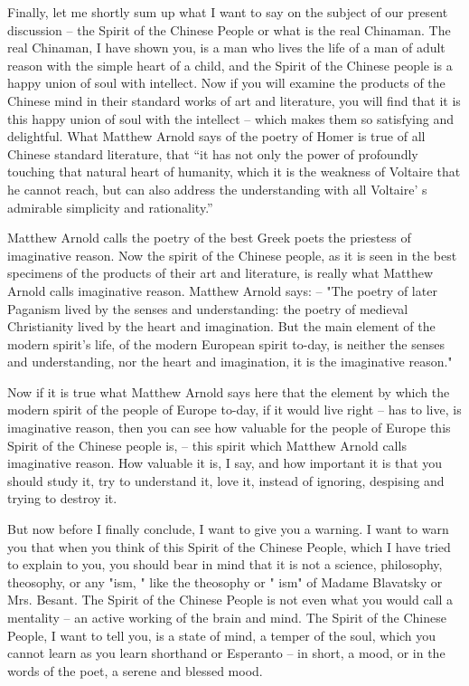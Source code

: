 Finally, let me shortly sum up what I want to say on the subject of our present discussion
-- the Spirit of the Chinese People or what is the real Chinaman.
The real Chinaman, I have shown you, is a man who lives the life of a man of adult reason with the simple heart of a child,
and the Spirit of the Chinese people is a happy union of soul with intellect.
Now if you will examine the products of the Chinese mind in their standard works of art and literature,
you will find that it is this happy union of soul with the intellect
-- which makes them so satisfying and delightful.
What Matthew Arnold says of the poetry of Homer is true of all Chinese standard literature, that
``it has not only the power of profoundly touching that natural heart of humanity,
which it is the weakness of Voltaire that he cannot reach,
but can also address the understanding with all Voltaire' s admirable simplicity and rationality.''

Matthew Arnold calls the poetry of the best Greek poets the priestess of imaginative reason. Now the spirit of the Chinese people, as it is seen in the best specimens of the products of their art and literature, is really what Matthew Arnold calls imaginative reason. Matthew Arnold says: -- "The poetry of later Paganism lived by the senses and understanding: the poetry of medieval Christianity lived by the heart and imagination. But the main element of the modern spirit's life, of the modern European spirit to-day, is neither the senses and understanding, nor the heart and imagination, it is the imaginative reason."

Now if it is true what Matthew Arnold says here that the element by which the modern spirit of the people of Europe to-day, if it would live right
-- has to live, is imaginative reason, then you can see how valuable for the people of Europe this Spirit of the Chinese people is,
-- this spirit which Matthew Arnold calls imaginative reason.
How valuable it is, I say, and how important it is that you should study it,
try to understand it, love it, instead of ignoring, despising and trying to destroy it.

But now before I finally conclude, I want to give you a warning. I want to warn you that when you think of this Spirit of the Chinese People, which I have tried to explain to you, you should bear in mind that it is not a science, philosophy, theosophy, or any "ism, " like the theosophy or " ism" of Madame Blavatsky or Mrs. Besant. The Spirit of the Chinese People is not even what you would call a mentality --  an active working of the brain and mind. The Spirit of the Chinese People, I want to tell you, is a state of mind, a temper of the soul, which you cannot learn as you learn shorthand or Esperanto -- in short, a mood, or in the words of the poet, a serene and blessed mood.

